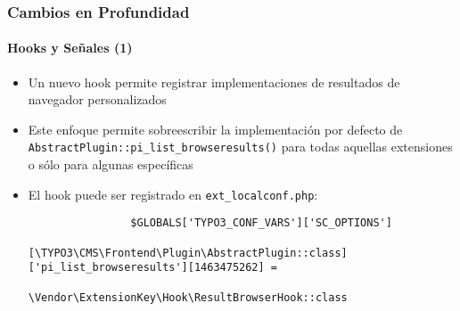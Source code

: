 \begin{frame}[fragile]
	\frametitle{Cambios en Profundidad}
	\framesubtitle{Hooks y Señales (1)}

	\lstset{basicstyle=\tiny\ttfamily}

	\begin{itemize}

		\item Un nuevo hook permite registrar implementaciones de resultados de navegador personalizados

		\item Este enfoque permite sobreescribir la implementación por defecto de
			\texttt{AbstractPlugin::pi\_list\_browseresults()}
			para todas aquellas extensiones o sólo para algunas específicas

		\item El hook puede ser registrado en \texttt{ext\_localconf.php}:

			\begin{lstlisting}
				$GLOBALS['TYPO3_CONF_VARS']['SC_OPTIONS']
				  [\TYPO3\CMS\Frontend\Plugin\AbstractPlugin::class]['pi_list_browseresults'][1463475262] =
				  \Vendor\ExtensionKey\Hook\ResultBrowserHook::class
			\end{lstlisting}

	\end{itemize}

\end{frame}


